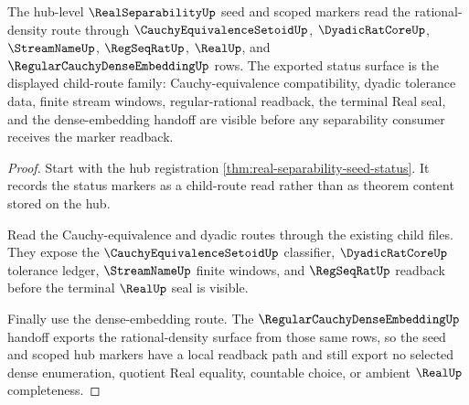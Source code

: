 \begin{theorem}
\label{thm:real-separability-seed-status-export}
The hub-level $\RealSeparabilityUp$ seed and scoped markers read the rational-density route through $\CauchyEquivalenceSetoidUp$, $\DyadicRatCoreUp$, $\StreamNameUp$, $\RegSeqRatUp$, $\RealUp$, and $\RegularCauchyDenseEmbeddingUp$ rows. The exported status surface is the displayed child-route family: Cauchy-equivalence compatibility, dyadic tolerance data, finite stream windows, regular-rational readback, the terminal Real seal, and the dense-embedding handoff are visible before any separability consumer receives the marker readback.
\end{theorem}
\begin{proof}
Start with the hub registration \autoref{thm:real-separability-seed-status}. It records the status markers as a child-route read rather than as theorem content stored on the hub.

Read the Cauchy-equivalence and dyadic routes through the existing child files. They expose the $\CauchyEquivalenceSetoidUp$ classifier, $\DyadicRatCoreUp$ tolerance ledger, $\StreamNameUp$ finite windows, and $\RegSeqRatUp$ readback before the terminal $\RealUp$ seal is visible.

Finally use the dense-embedding route. The $\RegularCauchyDenseEmbeddingUp$ handoff exports the rational-density surface from those same rows, so the seed and scoped hub markers have a local readback path and still export no selected dense enumeration, quotient Real equality, countable choice, or ambient $\RealUp$ completeness.
\end{proof}
